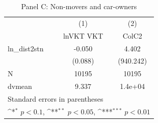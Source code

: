 \begin{table}[htbp]\centering
\def\sym#1{\ifmmode^{#1}\else\(^{#1}\)\fi}
\caption{Panel C: Non-movers and car-owners}
\begin{tabular}{l*{2}{c}}
\hline\hline
            &\multicolumn{1}{c}{(1)}&\multicolumn{1}{c}{(2)}\\
            &\multicolumn{1}{c}{lnVKT VKT}&\multicolumn{1}{c}{ColC2}\\
\hline
ln\_dist2stn &      -0.050         &       4.402         \\
            &     (0.088)         &   (940.242)         \\
\hline
N           &       10195         &       10195         \\
dvmean      &       9.337         &     1.4e+04         \\
\hline\hline
\multicolumn{3}{l}{\footnotesize Standard errors in parentheses}\\
\multicolumn{3}{l}{\footnotesize \sym{*} \(p<0.1\), \sym{**} \(p<0.05\), \sym{***} \(p<0.01\)}\\
\end{tabular}
\end{table}
